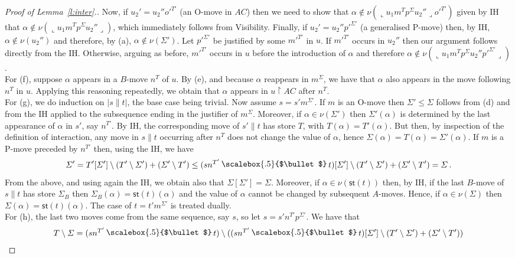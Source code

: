 \documentclass{CSML}
\theoremstyle{definition}\newtheorem{definition}[thm]{Definition}
\theoremstyle{definition}\newtheorem{example}[thm]{Example}
\theoremstyle{definition}\newtheorem{proposition}[thm]{Proposition}
\theoremstyle{definition}\newtheorem{lemma}[thm]{Lemma}
\theoremstyle{definition}\newtheorem{theorem}[thm]{Theorem}
\theoremstyle{definition}\newtheorem{corollary}[thm]{Corollary}
\theoremstyle{definition}\newtheorem{remark}[thm]{Remark}
\renewcommand\Sigma{\varSigma}
\newcommand\Tau{T}
\newcommand\ov[1]{\llcorner{#1}\lrcorner}
\newcommand\rest{\upharpoonright}
\newcommand\iseq{\mathop{\|}}
\newcommand\mix{\,\raisebox{.25ex}{\scalebox{.5}{$\bullet$}}\,}
\newcommand\remv{\setminus}
\newcommand\st[1]{\mathsf{st}(#1)}
\newcommand\substore\leq
\newcommand\na\alpha
\begin{document}
\begin{proof}[Proof of Lemma~\ref{l:inter}.]
Now, if $u_2'=u_2''o'^{\Tau'}$ (an O-move in $AC$) then we need to show that $\na\notin\nu(\ov{u_1m^\Tau p^\Sigma u_2''}o'^{\Tau'})$ given by IH that $\na\notin\nu(\ov{u_1m^\Tau p^\Sigma u_2''})$, which immediately follows from Visibility. Finally, if $u_2'=u_2''p'^{\Sigma'}$ (a generalised P-move) then, by IH, $\na\notin\nu(u_2'')$ and therefore, by (a), $\na\notin\nu(\Sigma')$. Let $p'^{\Sigma'}$ be justified by some $m'^{\Tau'}$ in $u$. If $m'^{\Tau'}$ occurs in $u_2''$ then our argument follows directly from the IH. Otherwise, arguing as before, $m'^{\Tau'}$ occurs in $u$ before the introduction of $\na$ and therefore $\na\notin\nu(\ov{u_1m^\Tau p^\Sigma u_2''p'^{\Sigma'}})$.
\\
For (f), suppose $\na$ appears in a $B$-move $n^{\Tau}$ of $u$. By (e), and because $\na$ reappears in $m^\Sigma$, we have that $\na$ also appears in the move following $n^{\Tau}$ in $u$. Applying this reasoning repeatedly, we obtain that $\na$ appears in $u\rest AC$ after $n^{\Tau}$.
\\
For (g), we do induction on $|s\iseq t|$, the base case being trivial. Now assume $s=s'm^{\Sigma'}$. If $m$ is an O-move then $\Sigma'\substore\Sigma$ follows from (d) and from the IH applied to the subsequence ending in the justifier of $m^\Sigma$. Moreover, if $\na\in\nu(\Sigma')$ then $\Sigma'(\na)$ is determined by the last appearance of $\na$ in $s'$, say $n^{\Tau'}$. By IH, the corresponding move of $s'\iseq t$ has store $\Tau$, with $\Tau(\na)=\Tau'(\na)$. But then, by inspection of the definition of interaction, any move in $s\iseq t$ occurring after $n^\Tau$ does not change the value of $\na$, hence $\Sigma(\na)=\Tau(\na)=\Sigma'(\na)$.
If $m$ is a P-move  preceded by $n^{\Tau'}$ then, using the IH, we have
\[ \Sigma'=\Tau'[\Sigma']\remv(\Tau'\remv\Sigma')+(\Sigma'\remv\Tau')\substore (sn^{\Tau'}\mix t)[\Sigma']\remv(\Tau'\remv\Sigma')+(\Sigma'\remv\Tau')=\Sigma\,.\]
From the above, and using again the IH, we obtain also that $\Sigma[\Sigma']=\Sigma$. Moreover, if $\na\in\nu(\st{t})$ then, by IH, if the last $B$-move of $s\iseq t$ has store $\Sigma_B$ then $\Sigma_B(\na)=\st{t}(\na)$ and the value of $\na$ cannot be changed by subsequent $A$-moves. Hence, if  $\na\in\nu(\Sigma)$ then $\Sigma(\na)=\st{t}(\na)$.
The case of $t=t'm^{\Sigma'}$ is treated dually.
\\
For (h), the last two moves come from the same sequence, say $s$, so let $s=s'n^{\Tau'}p^{\Sigma'}$. We have that
\begin{align*}
\Tau\remv\Sigma &= (sn^{\Tau'}\mix t)\remv((sn^{\Tau'}\mix t)[\Sigma']\remv(\Tau'\remv\Sigma')+(\Sigma'\remv\Tau')) \\

\end{align*}
\end{proof}
\end{document}
